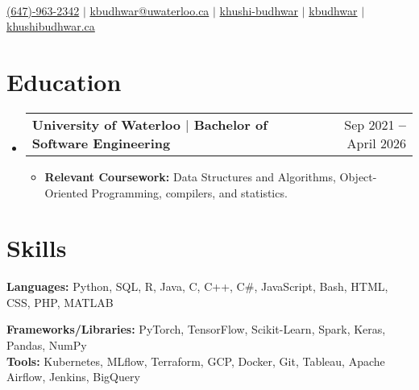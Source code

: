 \documentclass[letterpaper,11pt]{article}
\makeatletter
\newcommand{\resumeItem}[1]{
  \item\small{
    {#1 \vspace{-2pt}}
  }
}
\newcommand{\resumeSubheading}[2]{
  \vspace{-2pt}\item
    \begin{tabular*}{0.97\textwidth}[t]{l@{\extracolsep{\fill}}r}
      \textbf{#1} & \small{#2} \\
    \end{tabular*}\vspace{-5pt}
}
\newcommand{\resumeSubHeadingListStart}{\begin{itemize}[leftmargin=0.15in, label={}]}
\newcommand{\resumeSubHeadingListEnd}{\end{itemize}}
\newcommand{\resumeItemListStart}{\begin{itemize}}
\newcommand{\resumeItemListEnd}{\end{itemize}\vspace{-5pt}}
\makeatother
\begin{document}

\begin{center}
    {\color{customBlue}\fontsize{30pt}{96pt}\selectfont {KHUSHI BUDHWAR}} \\ \vspace{3pt}
    \small
    \faMobile \hspace{.5pt} \href{tel:6479632342}{(647)-963-2342}
    {$|$}
    \faEnvelope \hspace{.5pt} \href{mailto:kbudhwar@uwaterloo.ca}{kbudhwar@uwaterloo.ca}
    {$|$}
    \faLinkedinSquare \hspace{.5pt} \href{https://www.linkedin.com/in/khushi-budhwar/}{khushi-budhwar}
    {$|$}
    \scalebox{1.15}{\faGithub} \href{https://github.com/kbudhwar}{kbudhwar}
    {$|$}
    \scalebox{1.1}{\faGlobe}  \href{https://khushibudhwar.ca/}{khushibudhwar.ca}
\end{center}


\section{Education}
  \vspace{3pt}
  \resumeSubHeadingListStart
    \resumeSubheading
      {\color{customBlue} {University of Waterloo} \color{black} $|$ \small{Bachelor of Software} Engineering
      }{Sep 2021 \textbf{--} April 2026}
    \resumeItemListStart
        \resumeItem {\textbf{Relevant Coursework: }Data Structures and Algorithms, Object-Oriented Programming, compilers, and statistics.}
    \resumeItemListEnd
  \resumeSubHeadingListEnd


\section{Skills}
  \vspace{2pt}
  \resumeSubHeadingListStart
    \small{\item{
        
        \textbf{Languages:}{ Python, SQL, R, Java, C, C++, C\#, JavaScript, Bash, HTML, CSS, PHP, MATLAB} \\ \vspace{3pt}
        
        \textbf{Frameworks/Libraries:}{ PyTorch, TensorFlow, Scikit-Learn, Spark, Keras, Pandas, NumPy} \\ \vspace{3pt}
        \textbf{Tools:}{ Kubernetes, MLflow, Terraform, GCP, Docker, Git, Tableau, Apache Airflow, Jenkins, BigQuery} \\ \vspace{3pt}
        
    }}
  \resumeSubHeadingListEnd
\end{document}
